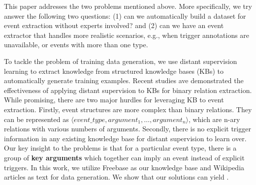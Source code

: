 This paper addresses the two problems mentioned above. More specifically, we try answer the following two questions:
(1) can we automatically build a dataset for event extraction without experts involved?
and (2) can we have an event extractor that handles more realistic scenarios, e.g.,  when trigger annotations are unavailable, or events with more than one type.



To tackle the problem of training data generation, we use distant supervision learning to extract knowledge from structured knowledge bases (KBs) 
to automatically generate training examples. 
Recent studies \cite{mintz2009distant,zeng2015distant} ave demonstrated the
effectiveness of applying distant supervision to KBs for binary relation extraction. While promising, 
there are two major hurdles for leveraging KB to event extraction. Firstly, event structures are more complex than 
binary relations. They can be
represented as $\langle event\_type, argument_1, \ldots, argument_n\rangle$, which are n-ary relations with various
numbers of arguments. Secondly, there is no explicit trigger information in any existing knowledge base for distant 
supervision to learn over. Our key insight to the problems is that for a particular event type, there is a group of
\textbf{key arguments} which together can imply an event instead of explicit triggers. 
In this work, we utilize Freebase as our
knowledge base and Wikipedia articles as text for data generation. We show that our solutions can yield  . 


